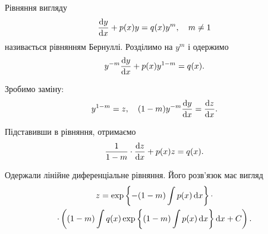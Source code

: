 Рівняння вигляду
\begin{equation*}
	\frac{\mathop{}\!\mathrm{d} y}{\mathop{}\!\mathrm{d} x} + p(x) y = q(x) y^m, \quad m \ne 1
\end{equation*}
називається рівнянням Бернуллі. Розділимо на $y^m$ і одержимо 
\begin{equation*}
	y^{-m} \frac{\mathop{}\!\mathrm{d} y}{\mathop{}\!\mathrm{d} x} + p(x) y^{1-m} = q(x).
\end{equation*}

Зробимо заміну: 
\begin{equation*}
	y^{1-m} = z, \quad (1 - m) y^{-m} \frac{\diff y}{\diff x} = \frac{\diff z}{\diff x}. %
\end{equation*}

Підставивши в рівняння, отримаємо
\begin{equation*}
	\frac{1}{1-m} \cdot \frac{\mathop{}\!\mathrm{d} z}{\mathop{}\!\mathrm{d} x} + p(x) z = q(x).
\end{equation*}

Одержали лінійне диференціальне рівняння. Його розв’язок має вигляд
\begin{multline*}
	z = \exp\left\{ -(1 - m) \int p(x) \mathop{}\!\mathrm{d} x \right\} \cdot \\ 
	\cdot \left( (1-m) \int q(x) \exp\left\{ (1 - m) \int p(x) \mathop{}\!\mathrm{d} x \right\} \mathop{}\!\mathrm{d} x + C\right).
\end{multline*}
